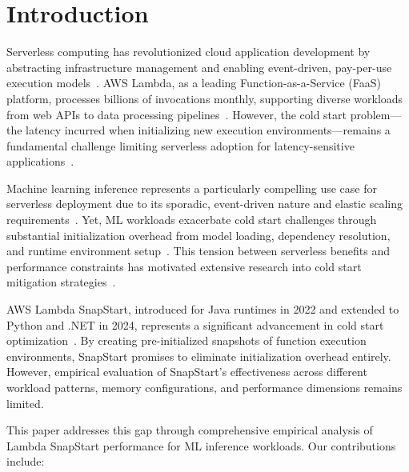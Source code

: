 \documentclass[conference]{IEEEtran}
\begin{document}
\section{Introduction}
Serverless computing has revolutionized cloud application development by abstracting infrastructure management and enabling event-driven, pay-per-use execution models~\cite{serverless-survey}. AWS Lambda, as a leading Function-as-a-Service (FaaS) platform, processes billions of invocations monthly, supporting diverse workloads from web APIs to data processing pipelines~\cite{aws-lambda-stats}. However, the cold start problem---the latency incurred when initializing new execution environments---remains a fundamental challenge limiting serverless adoption for latency-sensitive applications~\cite{cold-start-taxonomy}.

Machine learning inference represents a particularly compelling use case for serverless deployment due to its sporadic, event-driven nature and elastic scaling requirements~\cite{serverless-ml-survey}. Yet, ML workloads exacerbate cold start challenges through substantial initialization overhead from model loading, dependency resolution, and runtime environment setup~\cite{ml-cold-start-analysis}. This tension between serverless benefits and performance constraints has motivated extensive research into cold start mitigation strategies~\cite{cold-start-mitigation}.

AWS Lambda SnapStart, introduced for Java runtimes in 2022 and extended to Python and .NET in 2024, represents a significant advancement in cold start optimization~\cite{snapstart-announcement}. By creating pre-initialized snapshots of function execution environments, SnapStart promises to eliminate initialization overhead entirely. However, empirical evaluation of SnapStart's effectiveness across different workload patterns, memory configurations, and performance dimensions remains limited.

This paper addresses this gap through comprehensive empirical analysis of Lambda SnapStart performance for ML inference workloads. Our contributions include:
\end{document}
